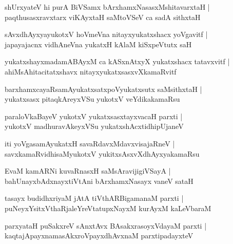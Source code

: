 \begin{shloka}
shUrxyateV hi purA BiVSamx bArxhamxNasasxMshitavarxtaH |\\
paqthusasxravxtarx viKAyxtaH saMtoVSeV ca sadA sithxtaH
\end{shloka}

\begin{shloka}
sAvxdhAyxyayukotxV hoVmeVna nitayxyukatxshacx yoVgavitf |\\
japayajacnx vidhAneVna yukatxH kAlaM kiSxpeVtutx saH
\end{shloka}

\begin{shloka}
yukatxshayxmadamABAyxM ca kASxnAtxyX yukatxshacx tatavxvitf |\\
ahiMsAhitacitatxshavx nitayxyukatxsasxvXkamaRvitf
\end{shloka}

\begin{shloka}
barxhamxcayaRsamAyukatxsatxpoVyukatxsutx saMsithxtaH |\\
yukatxsasx pitaqkAreyxVSu yukotxV veYdikakamaRsu
\end{shloka}

\begin{shloka}
paraloVkaBayeV yukotxV yukatxsasxtayxvacaH parxti |\\
yukotxV madhuravAkeyxVSu yukatxshAcxtidhipUjaneV 
\end{shloka}

\begin{shloka}
iti yoVgasamAyukatxH savaRdavxMdavxvisajaRneV |\\
savxkamaRvidhisaMyukotxV yukitxsAsxvXdhAyxyakamaRsu
\end{shloka}

\begin{shloka}
EvaM kamARNi kuvaRnasxH saMsAravijigiVSayA |\\
bahUnayxbAdxnayxtiVtAni bArxhamxNasayx vaneV sataH
\end{shloka}

\begin{shloka}
tasayx budidhxriyaM jAtA tiVthARBigamanaM parxti |\\
puNeyxYsitxVthaRjaleYreVtatupxNayxM kurAyxM kaLeVbaraM
\end{shloka}

\begin{shloka}
parxyataH puSakxreV sAnxtAvx BAsakxrasoyxVdayaM parxti |\\
kaqtajApayxnamasAkxroVpayxdhAvxnaM parxtipadayxteV 
\end{shloka}

